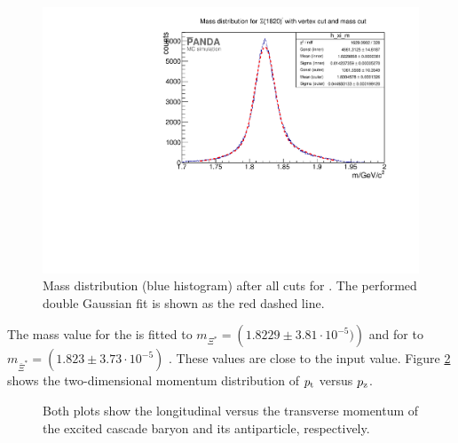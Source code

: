 	\begin{figure}
		\centering
		\includegraphics[width=1.\textwidth]{./plots/Xi1820/XiMinus1820_m_masscut.pdf}
		\caption{\propose Mass distribution (blue histogram) after all cuts for \excitedcascade. The performed double Gaussian fit is shown as the red dashed line.}
		\label{fig:xi1820_massfit}
	\end{figure}
	The mass value for the \excitedcascade is fitted to $m_{\Xi^{*}} = \left(1.8229 \pm 3.81 \cdot 10^{-5})\right)$ \massunit
	 and for \excitedanticascade to $m_{\bar{\Xi}^{*}} = \left(1.823 \pm 3.73\cdot 10^{-5}\right)$ \massunit.
	These values are close to the input value.
	Figure \ref{fig:xi1820_pt_vs_pz} shows the two-dimensional momentum distribution of $p_{\textnormal{t}}$ versus $p_{\textnormal{z}}$.
	
	\begin{figure}
		\centering
		\caption{\propose Both plots show the longitudinal versus the transverse momentum of the excited cascade baryon and its antiparticle, respectively.}
		\label{fig:xi1820_pt_vs_pz}
	\end{figure}
	
